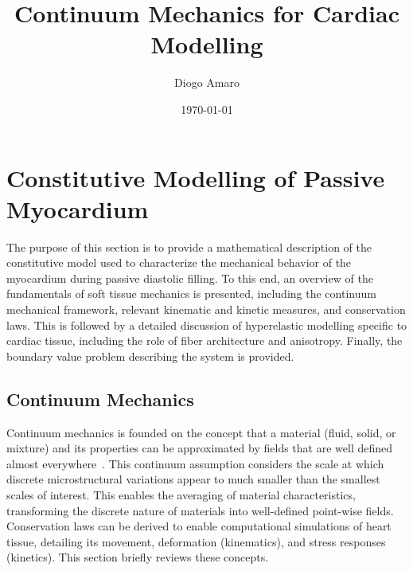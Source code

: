 \documentclass[a4paper,11pt]{article}
\title{Continuum Mechanics for Cardiac Modelling}
\author{Diogo Amaro}
\date{\today}
\begin{document}
\maketitle

\section{Constitutive Modelling of Passive Myocardium}

The purpose of this section is to provide a mathematical description of the constitutive model used to characterize the mechanical behavior of the myocardium during passive diastolic filling. To this end, an overview of the fundamentals of soft tissue mechanics is presented, including the continuum mechanical framework, relevant kinematic and kinetic measures, and conservation laws. This is followed by a detailed discussion of hyperelastic modelling specific to cardiac tissue, including the role of fiber architecture and anisotropy. Finally, the boundary value problem describing the system is provided.


\subsection{Continuum Mechanics}
Continuum mechanics is founded on the concept that a material (ﬂuid, solid, or mixture) and its properties can be approximated by ﬁelds that are well deﬁned almost everywhere~\cite{fung1977first, gurtin1982introduction, malvern1969introduction}. This continuum assumption considers the scale at which discrete microstructural variations appear to much smaller than the smallest scales of interest. This enables the averaging of material characteristics, transforming the discrete nature of materials into well-deﬁned point-wise ﬁelds. Conservation laws can be derived to enable computational simulations of heart tissue, detailing its movement, deformation (kinematics), and stress responses (kinetics). This section briefly reviews these concepts.
\end{document}
